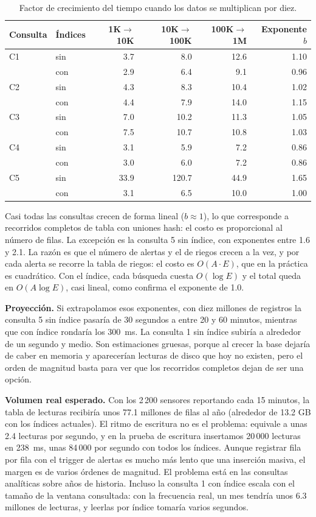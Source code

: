 \documentclass[11pt,letterpaper]{article}
\begin{document}
\begin{table}[H]
\centering\small
\begin{tabular}{llrrrr}
\toprule
Consulta & Índices & 1K$\to$10K & 10K$\to$100K & 100K$\to$1M & Exponente $b$ \\
\midrule
C1 & sin & 3.7 & 8.0 & 12.6 & 1.10 \\
 & con & 2.9 & 6.4 & 9.1 & 0.96 \\
C2 & sin & 4.3 & 8.3 & 10.4 & 1.02 \\
 & con & 4.4 & 7.9 & 14.0 & 1.15 \\
C3 & sin & 7.0 & 10.2 & 11.3 & 1.05 \\
 & con & 7.5 & 10.7 & 10.8 & 1.03 \\
C4 & sin & 3.1 & 5.9 & 7.2 & 0.86 \\
 & con & 3.0 & 6.0 & 7.2 & 0.86 \\
C5 & sin & 33.9 & 120.7 & 44.9 & 1.65 \\
 & con & 3.1 & 6.5 & 10.0 & 1.00 \\
\bottomrule
\end{tabular}
\caption{Factor de crecimiento del tiempo cuando los datos se multiplican por diez.}\label{tab:crecimiento}
\end{table}


Casi todas las consultas crecen de forma lineal ($b \approx 1$), lo que corresponde a recorridos completos de tabla con uniones hash: el costo es proporcional al número de filas. La excepción es la consulta 5 sin índice, con exponentes entre 1.6 y 2.1. La razón es que el número de alertas y el de riegos crecen a la vez, y por cada alerta se recorre la tabla de riegos: el costo es $O(A \cdot E)$, que en la práctica es cuadrático. Con el índice, cada búsqueda cuesta $O(\log E)$ y el total queda en $O(A \log E)$, casi lineal, como confirma el exponente de 1.0.

\textbf{Proyección.} Si extrapolamos esos exponentes, con diez millones de registros la consulta 5 sin índice pasaría de 30 segundos a entre 20 y 60 minutos, mientras que con índice rondaría los 300~ms. La consulta 1 sin índice subiría a alrededor de un segundo y medio. Son estimaciones gruesas, porque al crecer la base dejaría de caber en memoria y aparecerían lecturas de disco que hoy no existen, pero el orden de magnitud basta para ver que los recorridos completos dejan de ser una opción.

\textbf{Volumen real esperado.} Con los 2\,200 sensores reportando cada 15 minutos, la tabla de lecturas recibiría unos 77.1 millones de filas al año (alrededor de 13.2 GB con los índices actuales). El ritmo de escritura no es el problema: equivale a unas 2.4 lecturas por segundo, y en la prueba de escritura insertamos 20\,000 lecturas en 238~ms, unas 84\,000 por segundo con todos los índices. Aunque registrar fila por fila con el trigger de alertas es mucho más lento que una inserción masiva, el margen es de varios órdenes de magnitud. El problema está en las consultas analíticas sobre años de historia. Incluso la consulta 1 con índice escala con el tamaño de la ventana consultada: con la frecuencia real, un mes tendría unos 6.3 millones de lecturas, y leerlas por índice tomaría varios segundos.
\end{document}
